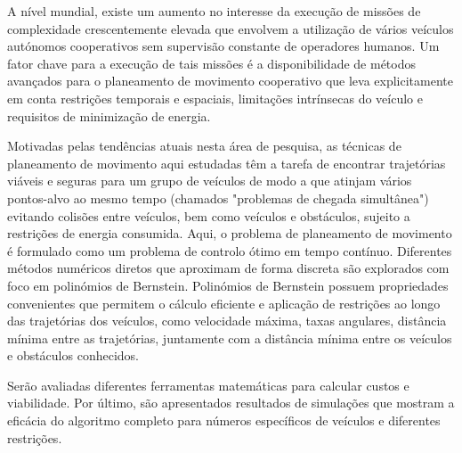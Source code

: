\noindent 


\par A nível mundial, existe um aumento no interesse da execução de missões de complexidade crescentemente elevada que envolvem a utilização de vários veículos autónomos cooperativos sem supervisão constante de operadores humanos. Um fator chave para a execução de tais missões é a disponibilidade de métodos avançados para o planeamento de movimento cooperativo que leva explicitamente em conta restrições temporais e espaciais, limitações intrínsecas do veículo e requisitos de minimização de energia.
\par Motivadas pelas tendências atuais nesta área de pesquisa, as técnicas de planeamento de movimento aqui estudadas têm a tarefa de encontrar trajetórias viáveis e seguras para um grupo de veículos de modo a que atinjam vários pontos-alvo ao mesmo tempo (chamados "problemas de chegada simultânea") evitando colisões entre veículos, bem como veículos e obstáculos, sujeito a restrições de energia consumida. Aqui, o problema de planeamento de movimento é formulado como um problema de controlo ótimo em tempo contínuo. Diferentes métodos numéricos diretos que aproximam de forma discreta são explorados com foco em polinómios de Bernstein. Polinómios de Bernstein possuem propriedades convenientes que permitem o cálculo eficiente e aplicação de restrições ao longo das trajetórias dos veículos, como velocidade máxima, taxas angulares, distância mínima entre as trajetórias, juntamente com a distância mínima entre os veículos e obstáculos conhecidos.
\par Serão avaliadas diferentes ferramentas matemáticas para calcular custos e viabilidade. Por último, são apresentados resultados de simulações que mostram a eficácia do algoritmo completo para números específicos de veículos e diferentes restrições.